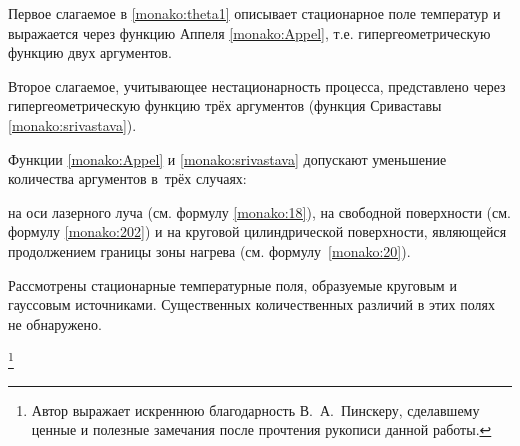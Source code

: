 Первое слагаемое в \eqref{monako:theta1} описывает стационарное поле температур и выражается через функцию Аппеля \eqref{monako:Appel}, т.е. гипергеометрическую функцию двух аргументов. 

Второе слагаемое, учитывающее нестационарность процесса, представлено через гипергеометрическую функцию трёх аргументов (функция Сриваставы \eqref{monako:srivastava}). 

Функции \eqref{monako:Appel} и \eqref{monako:srivastava} допускают уменьшение количества аргументов в~трёх случаях: 

на оси лазерного луча (см. формулу \eqref{monako:18}), на свободной поверхности (см. формулу \eqref{monako:202}) и на круговой цилиндрической поверхности, являющейся продолжением границы зоны нагрева (см. формулу~\eqref{monako:20}). 



Рассмотрены стационарные температурные поля, образуемые круговым и гауссовым источниками. Существенных количественных различий в этих полях не обнаружено. 



\thanks{Автор выражает искреннюю благодарность В.~А.~Пинскеру, сделавшему ценные и полезные замечания после прочтения рукописи данной работы.}



